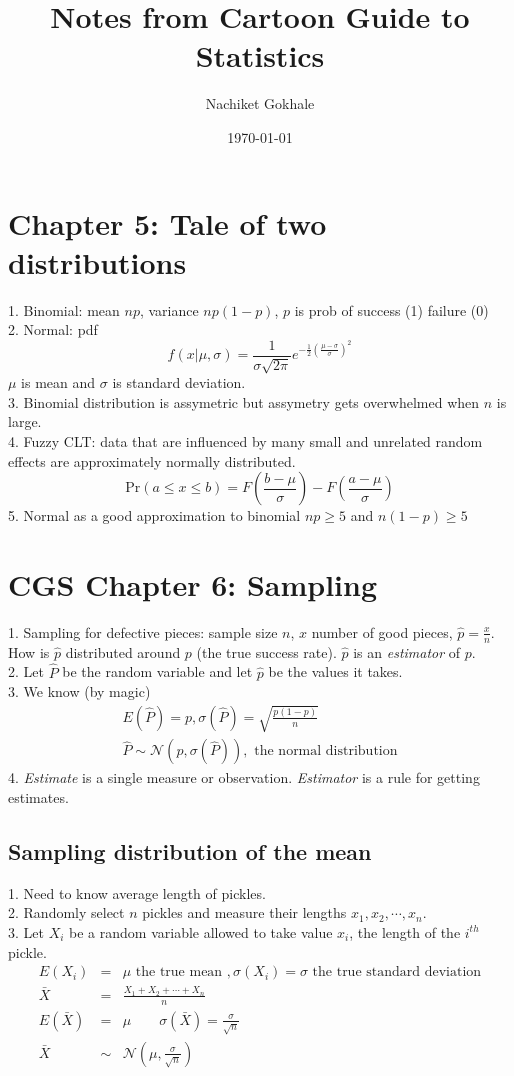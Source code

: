 \documentclass{article}
\newcommand{\beq}{\begin{equation}}
\newcommand{\eeq}{\end{equation}}
\newcommand{\ber}{\begin{eqnarray}}
\newcommand{\eer}{\end{eqnarray}}
\begin{document}
\title{Notes from Cartoon Guide to Statistics}
\author{Nachiket Gokhale}
\date{\today}
\maketitle
\section{Chapter 5: Tale of two distributions}
1. Binomial: mean $np$, variance $np(1-p)$, $p$ is prob of success (1) failure (0)\\
2. Normal: pdf
\beq
f(x|\mu,\sigma) = \frac{1}{\sigma\sqrt{2\pi}}e^{-\frac{1}{2}(\frac{\mu-\sigma}{\sigma})^2}
\eeq
$\mu$ is mean and $\sigma$ is standard deviation.\\
3. Binomial distribution is assymetric but assymetry gets overwhelmed when $n$ is large.\\
4. Fuzzy CLT: data that are influenced by many small and unrelated random effects are approximately normally distributed.
\beq
\text{Pr}(a\le{x}\le{b}) = F(\frac{b-\mu}{\sigma}) - F(\frac{a-\mu}{\sigma})
\eeq
5. Normal as a good approximation to binomial $np \ge 5 $ and $n(1-p)\ge 5$
\section{CGS Chapter 6: Sampling}
1. Sampling for defective pieces: sample size $n$, $x$ number of good pieces, $\hat{p}=\frac{x}{n}$. How is $\hat{p}$ distributed around $p$ (the true success rate). $\hat{p}$ is an \textit{estimator} of $p$.\\
2. Let $\hat{P}$ be the random variable and let $\hat{p}$ be the values it takes.\\
3. We know (by magic)
\ber
E(\hat{P}) = p , \sigma(\hat{P}) = \sqrt{\frac{p(1-p)}{n}}\\
\hat{P}\sim\mathcal{N}(p,\sigma(\hat{P})), \text{ the normal distribution}
\eer
4. \textit{Estimate} is a single measure or observation. \textit{Estimator} is a rule for getting estimates.\\
\subsection{Sampling distribution of the mean}
1. Need to know average length of pickles. \\
2. Randomly select $n$ pickles and measure their lengths $x_1,x_2,\cdots,x_n$.\\
3. Let $X_i$ be a random variable allowed to take value $x_i$, the length of the $i^{th}$ pickle.
\ber
E(X_i) &=& \mu \text{ the true mean }, \sigma(X_i) = \sigma \text{ the true standard deviation} \\
\bar{X} &=& \frac{X_1+X_2+\cdots+X_n}{n}\\
E(\bar{X}) &=& \mu \qquad \sigma(\bar{X}) = \frac{\sigma}{\sqrt{n}}\\
\bar{X} &\sim& \mathcal{N}(\mu,\frac{\sigma}{\sqrt{n}})
\eer
\end{document}
